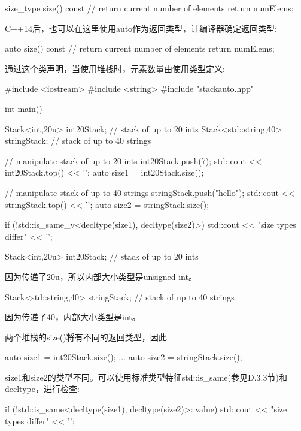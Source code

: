 \begin{cpp}
size_type size() const { // return current number of elements
	return numElems;
}
\end{cpp}

C++14后，也可以在这里使用auto作为返回类型，让编译器确定返回类型:

\begin{cpp}
auto size() const { // return current number of elements
	return numElems;
}
\end{cpp}

通过这个类声明，当使用堆栈时，元素数量由使用类型定义:

\begin{cpp}
#include <iostream>
#include <string>
#include "stackauto.hpp"

int main()
{
	Stack<int,20u> int20Stack; // stack of up to 20 ints
	Stack<std::string,40> stringStack; // stack of up to 40 strings
	
	// manipulate stack of up to 20 ints
	int20Stack.push(7);
	std::cout << int20Stack.top() << '\n';
	auto size1 = int20Stack.size();
	
	// manipulate stack of up to 40 strings
	stringStack.push("hello");
	std::cout << stringStack.top() << '\n';
	auto size2 = stringStack.size();
	
	if (!std::is_same_v<decltype(size1), decltype(size2)>) {
		std::cout << "size types differ" << '\n';
	}
}
\end{cpp}


\begin{cpp}
Stack<int,20u> int20Stack; // stack of up to 20 ints
\end{cpp}

因为传递了20u，所以内部大小类型是unsigned int。

\begin{cpp}
Stack<std::string,40> stringStack; // stack of up to 40 strings
\end{cpp}

因为传递了40，内部大小类型是int。

两个堆栈的size()将有不同的返回类型，因此

\begin{cpp}
auto size1 = int20Stack.size();
...
auto size2 = stringStack.size();
\end{cpp}

size1和size2的类型不同。可以使用标准类型特征std::is\_same(参见D.3.3节)和decltype，进行检查:

\begin{cpp}
if (!std::is_same<decltype(size1), decltype(size2)>::value) {
	std::cout << "size types differ" << '\n';
}
\end{cpp}

